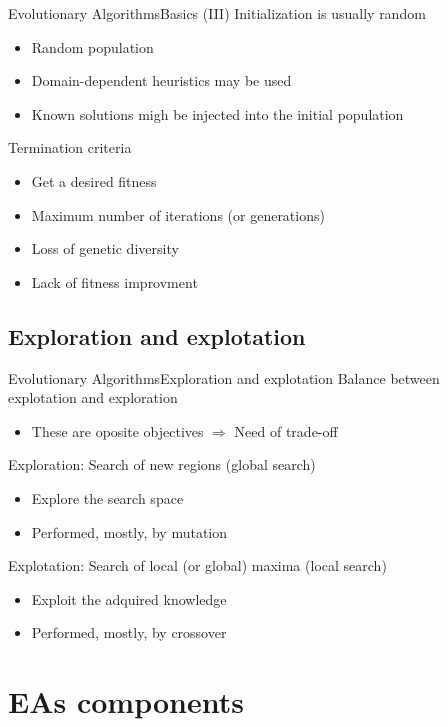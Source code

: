 \documentclass[10pt,compress]{beamer} %
\begin{document}
\begin{frame}{Evolutionary Algorithms}{Basics (III)}
	Initialization is usually random
	\begin{itemize}
		\item Random population
		\item Domain-dependent heuristics may be used
		\item Known solutions migh be injected into the initial population
	\end{itemize}
	Termination criteria
	\begin{itemize}
		\item Get a desired fitness
		\item Maximum number of iterations (or generations)
		\item Loss of genetic diversity
		\item Lack of fitness improvment
	\end{itemize}
\end{frame}

\subsection{Exploration and explotation}
\begin{frame}{Evolutionary Algorithms}{Exploration and explotation} 
	Balance between \alert{explotation} and \alert{exploration}
        \begin{itemize}
	    \item These are oposite objectives $\Rightarrow$ Need of trade-off
        \end{itemize}
	Exploration: Search of new regions (\alert{global search})
		\begin{itemize}
		\item Explore the search space
		\item Performed, mostly, by mutation
		\end{itemize}
	Explotation: Search of local (or global) maxima (\alert{local search})
		\begin{itemize}
		\item Exploit the adquired knowledge
		\item Performed, mostly, by crossover
		\end{itemize}
\end{frame}

\section{EAs components}
\end{document}
